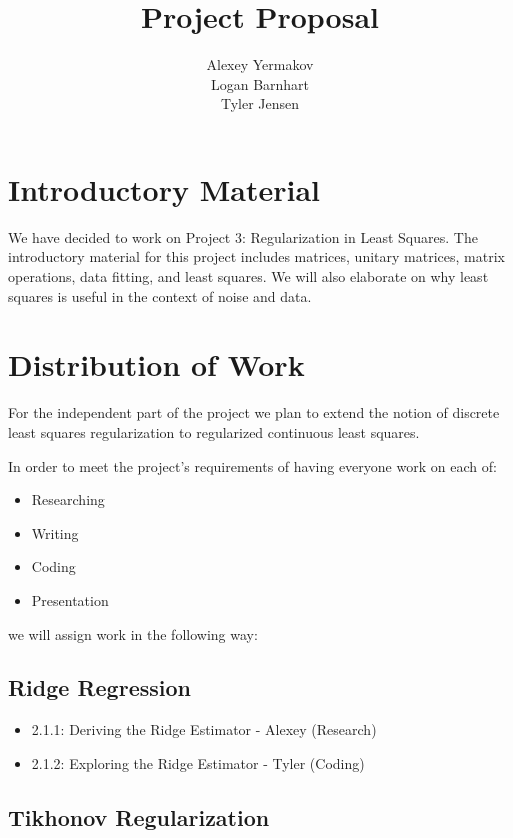 \documentclass{article}
\title{Project Proposal}
\author{Alexey Yermakov\\Logan Barnhart\\Tyler Jensen}
\begin{document}
    \maketitle

    \section{Introductory Material}

    We have decided to work on Project 3: Regularization in Least Squares. The introductory material for this project includes matrices, unitary matrices, matrix operations, data fitting, and least squares. We will also elaborate on why least squares is useful in the context of noise and data.

    \section{Distribution of Work}

    For the independent part of the project we plan to extend the notion of discrete least squares regularization to regularized continuous least squares.

    In order to meet the project's requirements of having everyone work on each of:

    \begin{itemize}
        \item Researching
        \item Writing
        \item Coding
        \item Presentation
    \end{itemize}

    we will assign work in the following way:

    \subsection{Ridge Regression}

    \begin{itemize}
        \item 2.1.1: Deriving the Ridge Estimator - Alexey (Research)
        \item 2.1.2: Exploring the Ridge Estimator - Tyler (Coding)
    \end{itemize}

    \subsection{Tikhonov Regularization}
\end{document}
